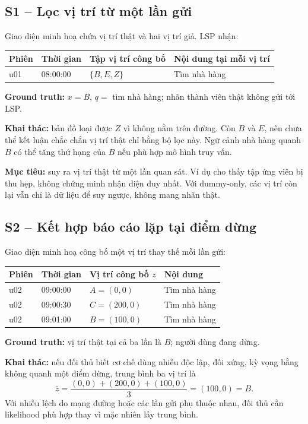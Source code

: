 \clearpage
\subsection{S1 -- Lọc vị trí từ một lần gửi}
\label{example:s1}

Giao diện minh hoạ chứa vị trí thật và hai vị trí giả. LSP nhận:
\begin{center}\small
\begin{tabular}{llll}
\toprule
Phiên & Thời gian & Tập vị trí công bố & Nội dung tại mỗi vị trí\\
\midrule
u01 & 08:00:00 & $\{B,E,Z\}$ & Tìm nhà hàng\\
\bottomrule
\end{tabular}
\end{center}
\textbf{Ground truth:} $x=B$, $q=$ tìm nhà hàng; nhãn thành viên thật không gửi tới LSP.

\textbf{Khai thác:} bản đồ loại được $Z$ vì không nằm trên đường. Còn $B$ và $E$, nên chưa thể kết luận chắc chắn vị trí thật chỉ bằng bộ lọc này. Ngữ cảnh nhà hàng quanh $B$ có thể tăng thứ hạng của $B$ nếu phù hợp mô hình truy vấn.

\textbf{Mục tiêu:} suy ra vị trí thật từ một lần quan sát. Ví dụ cho thấy tập ứng viên bị thu hẹp, không chứng minh nhận diện duy nhất. Với dummy-only, các vị trí còn lại vẫn chỉ là dữ liệu để suy ngược, không mang nhãn thật.

\clearpage
\subsection{S2 -- Kết hợp báo cáo lặp tại điểm dừng}
\label{example:s2}

Giao diện minh hoạ công bố một vị trí thay thế mỗi lần gửi:
\begin{center}\small
\begin{tabular}{llll}
\toprule
Phiên & Thời gian & Vị trí công bố $z$ & Nội dung\\
\midrule
u02 & 09:00:00 & $A=(0,0)$ & Tìm nhà hàng\\
u02 & 09:00:30 & $C=(200,0)$ & Tìm nhà hàng\\
u02 & 09:01:00 & $B=(100,0)$ & Tìm nhà hàng\\
\bottomrule
\end{tabular}
\end{center}
\textbf{Ground truth:} vị trí thật tại cả ba lần là $B$; người dùng đang dừng.

\textbf{Khai thác:} nếu đối thủ biết cơ chế dùng nhiễu độc lập, đối xứng, kỳ vọng bằng không quanh một điểm dừng, trung bình ba vị trí là
\[
\bar z=\frac{(0,0)+(200,0)+(100,0)}{3}=(100,0)=B.
\]
Với nhiễu lệch do mạng đường hoặc các lần gửi phụ thuộc nhau, đối thủ cần likelihood phù hợp thay vì mặc nhiên lấy trung bình.

